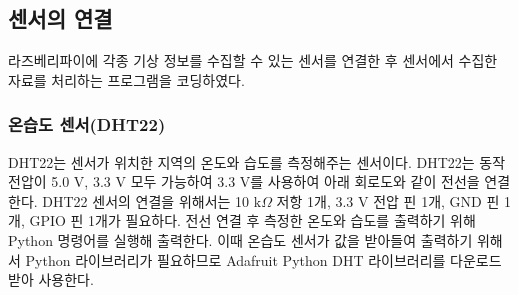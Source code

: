 \subsection{센서의 연결}

라즈베리파이에 각종 기상 정보를 수집할 수 있는 센서를 연결한 후 센서에서 수집한 자료를 처리하는 프로그램을 코딩하였다.

\begin{table}[htbp]
	\caption{연구에서 사용한 센서의 목록}
	\label{SENSOR}
\end{table}


\subsubsection{온습도 센서(DHT22)}
DHT22는 센서가 위치한 지역의 온도와 습도를 측정해주는 센서이다. DHT22는 동작 전압이 5.0 $\textrm{V}$, 3.3 $\textrm{V}$ 모두 가능하여 3.3 $\textrm{V}$를 사용하여 아래 회로도와 같이 전선을 연결한다. DHT22 센서의 연결을 위해서는 10 $\textrm{k}\Omega$ 저항 1개, 3.3 $\textrm{V}$ 전압 핀 1개, GND 핀 1개, GPIO 핀 1개가 필요하다. 전선 연결 후 측정한 온도와 습도를 출력하기 위해 Python 명령어를 실행해 출력한다. 이때 온습도 센서가 값을 받아들여 출력하기 위해서 Python 라이브러리가 필요하므로 Adafruit Python DHT 라이브러리를 다운로드 받아 사용한다.

